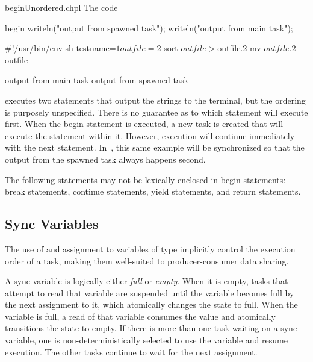 \begin{chapelexample}{beginUnordered.chpl}
The code
\begin{chapel}
begin writeln("output from spawned task");
writeln("output from main task");
\end{chapel}
\begin{chapelprediff}
\#!/usr/bin/env sh
testname=$1
outfile=$2
sort $outfile > $outfile.2
mv $outfile.2 $outfile
\end{chapelprediff}
\begin{chapelprintoutput}
output from main task
output from spawned task
\end{chapelprintoutput}
executes two  statements that output the strings to the
terminal, but the ordering is purposely unspecified.  There is no
guarantee as to which statement will execute first.  When the
begin statement is executed, a new task is created that will execute
the  statement within it.  However, execution will
continue immediately with the next statement.
In~, this same example will be synchronized so
that the output from the spawned task always happens second.
\end{chapelexample}

The following statements may not be lexically enclosed in
begin statements: break statements, continue statements,
yield statements, and return statements.

\subsection{Sync Variables}
\label{Sync_Variables}

The use of and assignment to variables of  type implicitly
control the execution order of a task, making them well-suited to
producer-consumer data sharing.

A sync variable is logically either {\em full} or {\em empty}.  When
it is empty, tasks that attempt to read that variable are suspended
until the variable becomes full by the next assignment to it, which
atomically changes the state to full.  When the variable is full, a
read of that variable consumes the value and atomically transitions
the state to empty.  If there is more than one task waiting on a sync
variable, one is non-deterministically selected to use the variable
and resume execution.  The other tasks continue to wait for the next
assignment.

